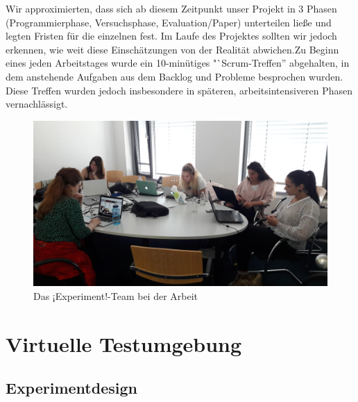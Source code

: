 \documentclass{Bericht}
\begin{document}
		Wir approximierten, dass sich ab diesem Zeitpunkt unser Projekt in 3 Phasen (Programmierphase, Versuchsphase, Evaluation/Paper) unterteilen ließe und legten Fristen für die einzelnen fest. Im Laufe des Projektes sollten wir jedoch erkennen, wie weit diese Einschätzungen von der Realität abwichen.Zu Beginn eines jeden Arbeitstages wurde ein 10-minütiges "`Scrum-Treffen'' abgehalten, in dem anstehende Aufgaben aus dem Backlog und Probleme besprochen wurden. Diese Treffen wurden jedoch insbesondere in späteren, arbeitsintensiveren Phasen vernachlässigt.\\

		
		\begin{figure}[H] %
			\centering
			\includegraphics[width=\linewidth, height=\textheight, keepaspectratio]{../Bilder/20170518_103125.jpg}
			\caption{Das ¡Experiment!-Team bei der Arbeit}
			\label{img:experiment-team-bei-der-arbeit}
		\end{figure}
		


\section{Virtuelle Testumgebung}

\subsection{Experimentdesign}
\end{document}
